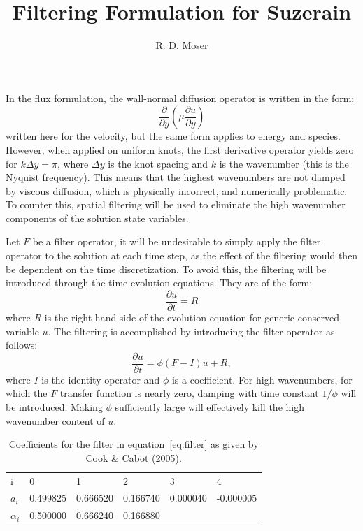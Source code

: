 \documentclass[11pt]{article}%
\title{Filtering Formulation for Suzerain}
\author{R. D. Moser}
\begin{document}
\maketitle


In the flux formulation, the wall-normal diffusion operator is written
in the form:
\begin{equation}
\frac{\partial}{\partial y}\left(\mu\frac{\partial u}{\partial y}\right)
\end{equation}
written here for the velocity, but the same form applies to energy and
species. However, when applied on uniform knots, the first derivative
operator yields zero for $k\Delta y=\pi$, where $\Delta y$ is the knot
spacing and $k$ is the wavenumber (this is the Nyquist frequency). This
means that the highest wavenumbers are not damped by viscous diffusion,
which is physically incorrect, and numerically problematic. To counter
this, spatial filtering will be used to eliminate the high wavenumber
components of the solution state variables.

Let $F$ be a filter operator, it will be undesirable to simply apply the
filter operator to the solution at each time step, as the effect of the
filtering would then be dependent on the time discretization. To avoid
this, the filtering will be introduced through the time evolution
equations. They are of the form:
\begin{equation}
\frac{\partial u}{\partial t} = R
\end{equation}
where $R$ is the right hand side of the evolution equation for generic
conserved variable $u$. The filtering is accomplished by introducing the
filter operator as follows:
\begin{equation}
\frac{\partial u}{\partial t} = \phi(F-I)u + R,
\label{eq:time_filter}
\end{equation}
where $I$ is the identity operator and $\phi$ is a coefficient. For high
wavenumbers, for which the $F$ transfer function is nearly zero, damping
with time constant $1/\phi$ will be introduced. Making $\phi$
sufficiently large will effectively kill the high wavenumber content of
$u$.

\begin{table}[t]
\begin{center}
\begin{tabular}{llllll}
i&0&1&2&3&4\\
$a_i$&0.499825&0.666520&0.166740&0.000040&-0.000005\\
$\alpha_i$&0.500000&0.666240&0.166880
\end{tabular}
\end{center}
\caption{Coefficients for the filter in equation~\ref{eq:filter} as
 given by Cook \& Cabot (2005).}
\label{tab:coefficients}
\end{table}
\end{document}
